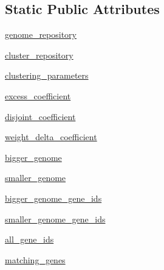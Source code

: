 \subsection*{Static Public Attributes}
\begin{DoxyCompactItemize}
\item 
\hyperlink{classNEAT__PyGenetics_1_1NEAT_1_1Analyst_1_1GenomeClusterer_1_1GenomeClusterer_af9623df2d784da3e4c186b729c63bb81}{genome\+\_\+repository}
\item 
\hyperlink{classNEAT__PyGenetics_1_1NEAT_1_1Analyst_1_1GenomeClusterer_1_1GenomeClusterer_ab9332a669c7c28ee6d33806da38eee45}{cluster\+\_\+repository}
\item 
\hyperlink{classNEAT__PyGenetics_1_1NEAT_1_1Analyst_1_1GenomeClusterer_1_1GenomeClusterer_a23498ab192f633f9bada8709832b5fed}{clustering\+\_\+parameters}
\item 
\hyperlink{classNEAT__PyGenetics_1_1NEAT_1_1Analyst_1_1GenomeClusterer_1_1GenomeClusterer_aefeaee4266e3fab9ff64f0b23fa08902}{excess\+\_\+coefficient}
\item 
\hyperlink{classNEAT__PyGenetics_1_1NEAT_1_1Analyst_1_1GenomeClusterer_1_1GenomeClusterer_a2d3a31646312ae391f5805b5f5a7c0c5}{disjoint\+\_\+coefficient}
\item 
\hyperlink{classNEAT__PyGenetics_1_1NEAT_1_1Analyst_1_1GenomeClusterer_1_1GenomeClusterer_a4d2e391563722c816e807faf0011aabf}{weight\+\_\+delta\+\_\+coefficient}
\item 
\hyperlink{classNEAT__PyGenetics_1_1NEAT_1_1Analyst_1_1GenomeClusterer_1_1GenomeClusterer_a5b2d70ae35a4051f4663c496190f0780}{bigger\+\_\+genome}
\item 
\hyperlink{classNEAT__PyGenetics_1_1NEAT_1_1Analyst_1_1GenomeClusterer_1_1GenomeClusterer_a5b0b90cb5b44c29ae3a062a9f591cee9}{smaller\+\_\+genome}
\item 
\hyperlink{classNEAT__PyGenetics_1_1NEAT_1_1Analyst_1_1GenomeClusterer_1_1GenomeClusterer_a3046dce6838bbf4b7209358ca3c88a2a}{bigger\+\_\+genome\+\_\+gene\+\_\+ids}
\item 
\hyperlink{classNEAT__PyGenetics_1_1NEAT_1_1Analyst_1_1GenomeClusterer_1_1GenomeClusterer_ac6b59f46ec08ad39bb46b6597591ab6f}{smaller\+\_\+genome\+\_\+gene\+\_\+ids}
\item 
\hyperlink{classNEAT__PyGenetics_1_1NEAT_1_1Analyst_1_1GenomeClusterer_1_1GenomeClusterer_a73179831aa538106f4b8d7dcb54c82c7}{all\+\_\+gene\+\_\+ids}
\item 
\hyperlink{classNEAT__PyGenetics_1_1NEAT_1_1Analyst_1_1GenomeClusterer_1_1GenomeClusterer_a47fed7fbdbd9d079e693921bc38e5f3e}{matching\+\_\+genes}

\end{DoxyCompactItemize}

